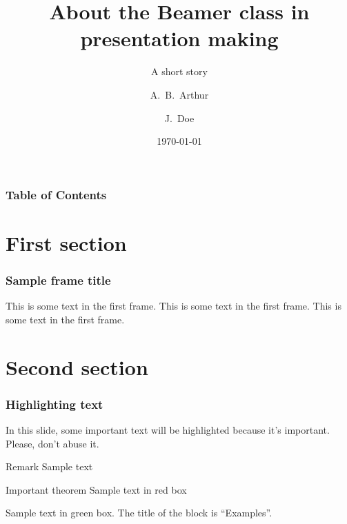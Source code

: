 \documentclass{beamer}
\title[About Beamer]
{About the Beamer class in presentation making}
\subtitle{A short story}
\author[Arthur, Doe] %
{A.~B.~Arthur\inst{1} \and J.~Doe\inst{2}}
\institute[NJU] %
{
\inst{1}%
Faculty of Physics\\
Very Famous University
\and
\inst{2}%
Faculty of Chemistry\\
Very Famous University
}
\date[ICLR 2023] %
{\today}
\begin{document}
\frame{\titlepage}

\begin{frame}
    \frametitle{Table of Contents}
    \tableofcontents
\end{frame}

\section{First section}

\begin{frame}
    \frametitle{Sample frame title}
    This is some text in the first frame. This is some text in the first frame. This is some text in the first frame.
\end{frame}

\section{Second section}

\begin{frame}
    \frametitle{Highlighting text}

    In this slide, some important text will be
    \alert{highlighted} because it's important.
    Please, don't abuse it.

    \begin{block}{Remark}
        Sample text
    \end{block}

    \begin{alertblock}{Important theorem}
        Sample text in red box
    \end{alertblock}

    \begin{examples}
        Sample text in green box. The title of the block is ``Examples''.
    \end{examples}
\end{frame}
\end{document}
